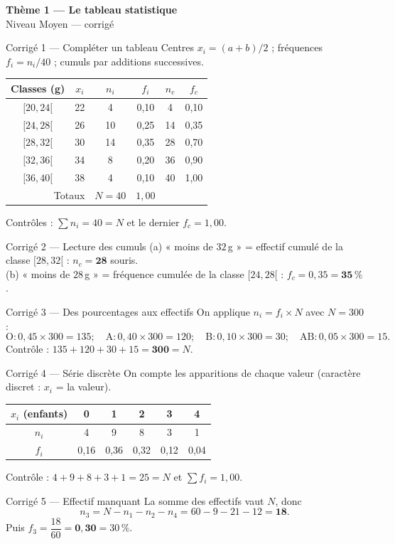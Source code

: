 \documentclass[11pt,a4paper]{article}
\newcommand{\bandeau}[2]{%
\begin{tcolorbox}[boxbase,colback=primary,colframe=primarydark,halign=center,
   before skip=2pt,after skip=12pt]
{\LARGE\bfseries\color{white} #1}\\[3pt]{\normalsize\color{white} #2}
\end{tcolorbox}}
\begin{document}
\bandeau{Thème 1 — Le tableau statistique}{Niveau Moyen — corrigé}

\begin{corbox}{Corrigé 1 — Compléter un tableau}
Centres $x_i=(a+b)/2$ ; fréquences $f_i=n_i/40$ ; cumuls par additions successives.
\begin{center}
\renewcommand{\arraystretch}{1.2}
\begin{tabular}{|c|c|c|c|c|c|}
\hline
\rowcolor{primary!18}
Classes (g) & $x_i$ & $n_i$ & $f_i$ & $n_c$ & $f_c$ \\\hline
$[20,24[$ & 22 & 4  & 0{,}10 & 4  & 0{,}10 \\
$[24,28[$ & 26 & 10 & 0{,}25 & 14 & 0{,}35 \\
$[28,32[$ & 30 & 14 & 0{,}35 & 28 & 0{,}70 \\
$[32,36[$ & 34 & 8  & 0{,}20 & 36 & 0{,}90 \\
$[36,40[$ & 38 & 4  & 0{,}10 & 40 & 1{,}00 \\\hline
\multicolumn{2}{|r|}{Totaux} & $N=40$ & $1{,}00$ & & \\\hline
\end{tabular}
\end{center}
Contrôles : $\sum n_i=40=N$ et le dernier $f_c=1{,}00$. \checkmark
\end{corbox}

\begin{corbox}{Corrigé 2 — Lecture des cumuls}
(a) « moins de $32$\,g » = effectif cumulé de la classe $[28,32[$ : $n_c=\mathbf{28}$ souris.\\
(b) « moins de $28$\,g » = fréquence cumulée de la classe $[24,28[$ : $f_c=0{,}35=\mathbf{35\,\%}$.
\end{corbox}

\begin{corbox}{Corrigé 3 — Des pourcentages aux effectifs}
On applique $n_i=f_i\times N$ avec $N=300$ :
\[
\text{O}:0{,}45\times300=135;\quad \text{A}:0{,}40\times300=120;\quad
\text{B}:0{,}10\times300=30;\quad \text{AB}:0{,}05\times300=15.
\]
Contrôle : $135+120+30+15=\mathbf{300}=N$. \checkmark
\end{corbox}

\begin{corbox}{Corrigé 4 — Série discrète}
On compte les apparitions de chaque valeur (caractère discret : $x_i$ = la valeur).
\begin{center}
\renewcommand{\arraystretch}{1.2}
\begin{tabular}{|c|c|c|c|c|c|}
\hline
\rowcolor{primary!18}
$x_i$ (enfants) & 0 & 1 & 2 & 3 & 4 \\\hline
$n_i$ & 4 & 9 & 8 & 3 & 1 \\\hline
$f_i$ & 0{,}16 & 0{,}36 & 0{,}32 & 0{,}12 & 0{,}04 \\\hline
\end{tabular}
\end{center}
Contrôle : $4+9+8+3+1=25=N$ et $\sum f_i=1{,}00$. \checkmark
\end{corbox}

\begin{corbox}{Corrigé 5 — Effectif manquant}
La somme des effectifs vaut $N$, donc
\[ n_3=N-n_1-n_2-n_4=60-9-21-12=\mathbf{18}. \]
Puis $f_3=\dfrac{18}{60}=\mathbf{0{,}30}=30\,\%$.
\end{corbox}
\end{document}
